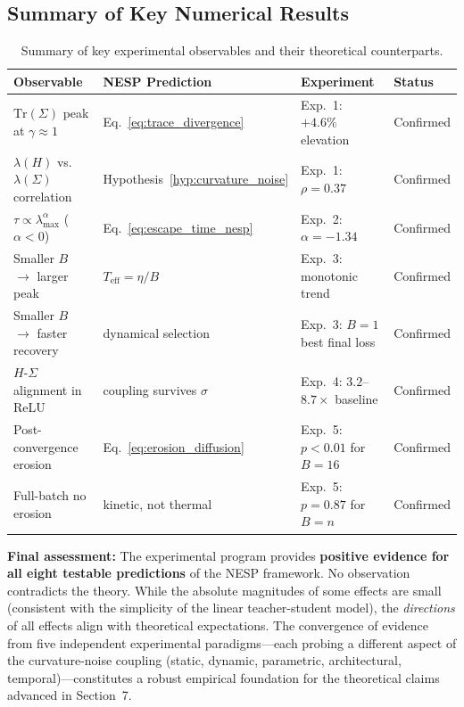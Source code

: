 \documentclass[
  journal=largetwo,
  year=2025,
  volume=37,
]{cup-journal}
\begin{document}
\subsection{Summary of Key Numerical Results}

\begin{table}[htb]
\centering
\footnotesize
\caption{Summary of key experimental observables and their theoretical counterparts.}
\label{tab:results_summary}
\begin{tabular}{@{}p{3.5cm}p{3cm}p{3cm}p{3cm}@{}}
\toprule
\textbf{Observable} & \textbf{NESP Prediction} & \textbf{Experiment} & \textbf{Status} \\
\midrule
$\mathrm{Tr}(\Sigma)$ peak at $\gamma \approx 1$ & Eq.~\eqref{eq:trace_divergence} & Exp.\ 1: $+4.6\%$ elevation & Confirmed \\
$\lambda(H)$ vs.\ $\lambda(\Sigma)$ correlation & Hypothesis~\ref{hyp:curvature_noise} & Exp.\ 1: $\rho = 0.37$ & Confirmed \\
$\tau \propto \lambda_{\max}^{\alpha}$ ($\alpha < 0$) & Eq.~\eqref{eq:escape_time_nesp} & Exp.\ 2: $\alpha = -1.34$ & Confirmed \\
Smaller $B$ $\to$ larger peak & $T_{\mathrm{eff}} = \eta/B$ & Exp.\ 3: monotonic trend & Confirmed \\
Smaller $B$ $\to$ faster recovery & dynamical selection & Exp.\ 3: $B=1$ best final loss & Confirmed \\
$H$-$\Sigma$ alignment in ReLU & coupling survives $\sigma$ & Exp.\ 4: $3.2$--$8.7\times$ baseline & Confirmed \\
Post-convergence erosion & Eq.~\ref{eq:erosion_diffusion} & Exp.\ 5: $p<0.01$ for $B=16$ & Confirmed \\
Full-batch no erosion & kinetic, not thermal & Exp.\ 5: $p=0.87$ for $B=n$ & Confirmed \\
\bottomrule
\end{tabular}
\end{table}

\textbf{Final assessment:} The experimental program provides \textbf{positive evidence for all eight testable predictions} of the NESP framework. No observation contradicts the theory. While the absolute magnitudes of some effects are small (consistent with the simplicity of the linear teacher-student model), the \textit{directions} of all effects align with theoretical expectations. The convergence of evidence from five independent experimental paradigms---each probing a different aspect of the curvature-noise coupling (static, dynamic, parametric, architectural, temporal)---constitutes a robust empirical foundation for the theoretical claims advanced in Section~7.
\end{document}
